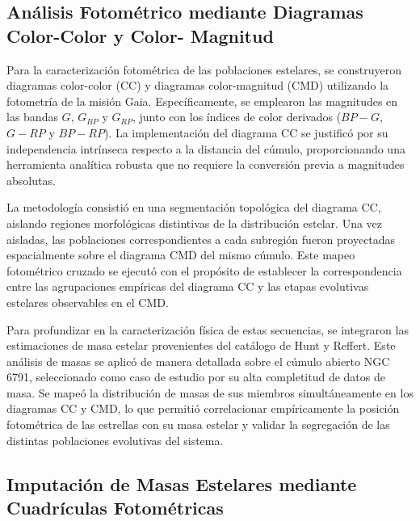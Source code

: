         \subsection{Análisis Fotométrico mediante Diagramas Color-Color y Color-
        Magnitud}

            Para la caracterización fotométrica de las poblaciones estelares, se 
            construyeron diagramas color-color (CC) y diagramas color-magnitud 
            (CMD) utilizando la fotometría de la misión Gaia. Específicamente, 
            se emplearon las magnitudes en las bandas $G$, $G_{BP}$ y $G_{RP}$, 
            junto con los índices de color derivados ($BP-G$, $G-RP$ y $BP-RP$). 
            La implementación del diagrama CC se justificó por su independencia 
            intrínseca respecto a la distancia del cúmulo, proporcionando una 
            herramienta analítica robusta que no requiere la conversión previa a 
            magnitudes absolutas.

            La metodología consistió en una segmentación topológica del diagrama 
            CC, aislando regiones morfológicas distintivas de la distribución 
            estelar. Una vez aisladas, las poblaciones correspondientes a cada 
            subregión fueron proyectadas espacialmente sobre el diagrama CMD del 
            mismo cúmulo. Este mapeo fotométrico cruzado se ejecutó con el 
            propósito de establecer la correspondencia entre las agrupaciones 
            empíricas del diagrama CC y las etapas evolutivas estelares 
            observables en el CMD.

            Para profundizar en la caracterización física de estas secuencias, 
            se integraron las estimaciones de masa estelar provenientes del 
            catálogo de Hunt y Reffert. Este análisis de masas se aplicó de 
            manera detallada sobre el cúmulo abierto NGC 6791, seleccionado como 
            caso de estudio por su alta completitud de datos de masa. Se mapeó 
            la distribución de masas de sus miembros simultáneamente en los 
            diagramas CC y CMD, lo que permitió correlacionar empíricamente la 
            posición fotométrica de las estrellas con su masa estelar y validar 
            la segregación de las distintas poblaciones evolutivas del sistema.

        \subsection{Imputación de Masas Estelares mediante Cuadrículas 
        Fotométricas}

